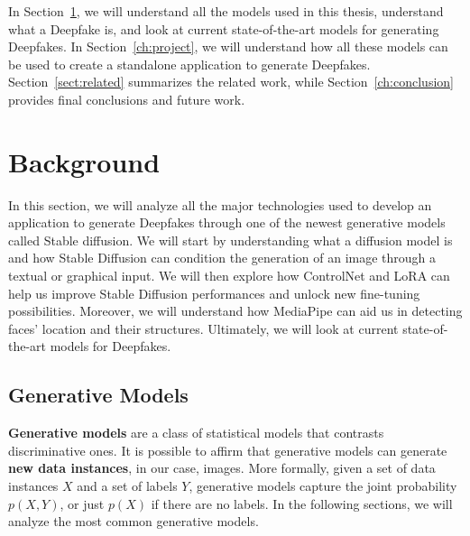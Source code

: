 \documentclass[preprint]{elsarticle}
\begin{document}

In Section~\ref{ch:background}, we will understand all the models used in this thesis, understand what a Deepfake is, and look at current state-of-the-art models for generating Deepfakes.
In Section~\ref{ch:project}, we will understand how all these models can be used to create a standalone application to generate Deepfakes. Section~\ref{sect:related} summarizes the related work, while Section~\ref{ch:conclusion} provides final conclusions and future work.



\section{Background}\label{ch:background}

In this section, we will analyze all the major technologies used to develop an application to generate 
Deepfakes through one of the newest generative models called Stable diffusion. 
We will start by understanding what a diffusion model is and how Stable Diffusion can condition the 
generation of an image through a textual or graphical input. 
We will then explore how ControlNet and LoRA can help us improve Stable Diffusion performances and unlock new fine-tuning possibilities. 
Moreover, we will understand how MediaPipe can aid us in detecting faces' location and their structures. 
Ultimately, we will look at current state-of-the-art models for Deepfakes.



\subsection{Generative Models} \label{sec:imggenmodels}
\textbf{Generative models} are a class of statistical models that contrasts discriminative ones. 
It is possible to affirm that generative models can generate \textbf{new data instances}, 
in our case, images. 
More formally, given a set of data instances $X$ and a set of labels $Y$, 
generative models capture the joint probability $p(X, Y)$, or just $p(X)$ if there are no labels. 
In the following sections, we will analyze the most common generative models.
\end{document}
